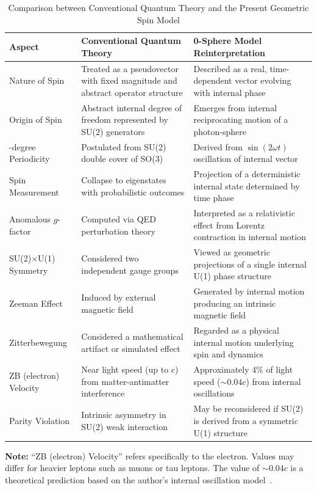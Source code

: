 \documentclass[%
 reprint,
 amsmath,amssymb,
 aps,
]{revtex4-1}
\numberwithin{equation}{section}%
\begin{document}
\begin{table}[t!]
\caption{Comparison between Conventional Quantum Theory and the Present Geometric Spin Model}
\label{tab:comparison}
\renewcommand{\arraystretch}{1.3}
\begin{tabular}{p{4.5cm}p{6.5cm}p{6.5cm}}
\toprule
\textbf{Aspect} & \textbf{Conventional Quantum Theory} & \textbf{0-Sphere Model Reinterpretation} \\
\midrule
Nature of Spin & Treated as a pseudovector with fixed magnitude and abstract operator structure & Described as a real, time-dependent vector evolving with internal phase \\
\addlinespace[0.3cm]
Origin of Spin & Abstract internal degree of freedom represented by SU(2) generators & Emerges from internal reciprocating motion of a photon-sphere \\
\addlinespace[0.3cm]
720-degree Periodicity & Postulated from SU(2) double cover of SO(3) & Derived from $\sin(2\omega t)$ oscillation of internal vector \\
\addlinespace[0.3cm]
Spin Measurement & Collapse to eigenstates with probabilistic outcomes & Projection of a deterministic internal state determined by time phase \\
\addlinespace[0.3cm]
Anomalous $g$-factor & Computed via QED perturbation theory & Interpreted as a relativistic effect from Lorentz contraction in internal motion \\
\addlinespace[0.3cm]
SU(2)$\times$U(1) Symmetry & Considered two independent gauge groups & Viewed as geometric projections of a single internal U(1) phase structure \\
\addlinespace[0.3cm]
Zeeman Effect & Induced by external magnetic field & Generated by internal motion producing an intrinsic magnetic field \\
\addlinespace[0.3cm]
Zitterbewegung & Considered a mathematical artifact or simulated effect & Regarded as a physical internal motion underlying spin and dynamics \\
\addlinespace[0.3cm]
ZB (electron) Velocity & Near light speed (up to $c$) from matter-antimatter interference & Approximately 4\% of light speed ($\sim 0.04c$) from internal oscillations \\
\addlinespace[0.3cm]
Parity Violation & Intrinsic asymmetry in SU(2) weak interaction & May be reconsidered if SU(2) is derived from a symmetric U(1) structure \\
\bottomrule
\end{tabular}
\vspace{0.2cm}
\begin{flushleft}
\footnotesize
\textbf{Note:} ``ZB (electron) Velocity'' refers specifically to the electron. Values may differ for heavier leptons such as muons or tau leptons.  
The value of $\sim 0.04c$ is a theoretical prediction based on the author's internal oscillation model~\cite{hanamura2501.0130}.
\end{flushleft}
\end{table}
\end{document}
